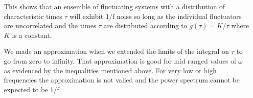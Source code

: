 \documentclass{article}
\begin{document}
This shows that an ensemble of fluctuating systems with a distribution of characteristic times $\tau$ will exhibit 1/f noise so long as the individual fluctuators are uncorrelated and the times $\tau$ are distributed according to $g(\tau)=K/\tau$ where $K$ is a constant.

We made an approximation when we extended the limits of the integral on $\tau$ to go from zero to infinity.
That approximation is good for mid ranged values of $\omega$ as evidenced by the inequalities mentioned above.
For very low or high frequencies the approximation is not valied and the power spectrum cannot be expected to be 1/f.
\end{document}
